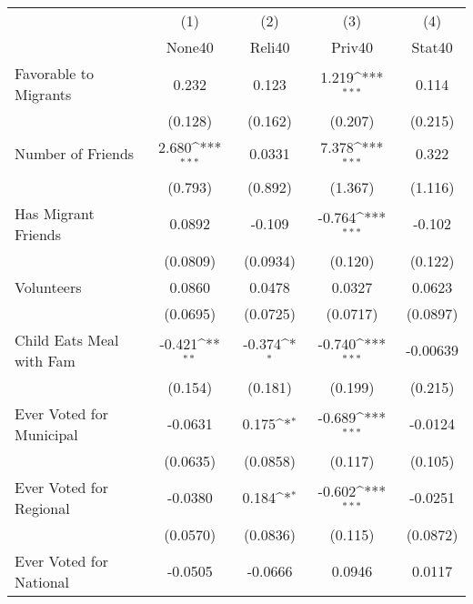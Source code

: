 {
\def\sym#1{\ifmmode^{#1}\else\(^{#1}\)\fi}
\begin{tabular}{l*{4}{c}}
\hline\hline
            &\multicolumn{1}{c}{(1)}&\multicolumn{1}{c}{(2)}&\multicolumn{1}{c}{(3)}&\multicolumn{1}{c}{(4)}\\
            &\multicolumn{1}{c}{None40}&\multicolumn{1}{c}{Reli40}&\multicolumn{1}{c}{Priv40}&\multicolumn{1}{c}{Stat40}\\
\hline
Favorable to Migrants&       0.232         &       0.123         &       1.219\sym{***}&       0.114         \\
            &     (0.128)         &     (0.162)         &     (0.207)         &     (0.215)         \\
[1em]
Number of Friends&       2.680\sym{***}&      0.0331         &       7.378\sym{***}&       0.322         \\
            &     (0.793)         &     (0.892)         &     (1.367)         &     (1.116)         \\
[1em]
Has Migrant Friends&      0.0892         &      -0.109         &      -0.764\sym{***}&      -0.102         \\
            &    (0.0809)         &    (0.0934)         &     (0.120)         &     (0.122)         \\
[1em]
Volunteers  &      0.0860         &      0.0478         &      0.0327         &      0.0623         \\
            &    (0.0695)         &    (0.0725)         &    (0.0717)         &    (0.0897)         \\
[1em]
Child Eats Meal with Fam&      -0.421\sym{**} &      -0.374\sym{*}  &      -0.740\sym{***}&    -0.00639         \\
            &     (0.154)         &     (0.181)         &     (0.199)         &     (0.215)         \\
[1em]
Ever Voted for Municipal&     -0.0631         &       0.175\sym{*}  &      -0.689\sym{***}&     -0.0124         \\
            &    (0.0635)         &    (0.0858)         &     (0.117)         &     (0.105)         \\
[1em]
Ever Voted for Regional&     -0.0380         &       0.184\sym{*}  &      -0.602\sym{***}&     -0.0251         \\
            &    (0.0570)         &    (0.0836)         &     (0.115)         &    (0.0872)         \\
[1em]
Ever Voted for National&     -0.0505         &     -0.0666         &      0.0946         &      0.0117         \\

\end{tabular}}
